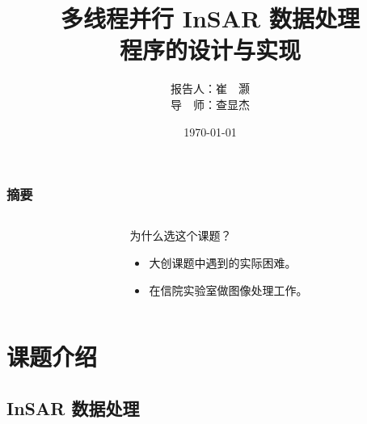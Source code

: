 \documentclass{beamer}
\title{多线程并行 InSAR 数据处理\\程序的设计与实现}
\author{报告人：崔　灏\\ 导　师：查显杰}
\institute{中国科学技术大学\\地球和空间科学学院}
\date{\today}
\begin{document}
\frame{\titlepage}

\begin{frame}
    \frametitle{摘要}
    \begin{columns}
        \begin{column}{0.4\textwidth}
            \tableofcontents
        \end{column}
        \begin{column}{0.6\textwidth}
            为什么选这个课题？
            \begin{itemize}
                \item 大创课题中遇到的实际困难。
                \item 在信院实验室做图像处理工作。
            \end{itemize}
        \end{column}
    \end{columns}
\end{frame}

\section{课题介绍}
\subsection{InSAR 数据处理}
\end{document}
